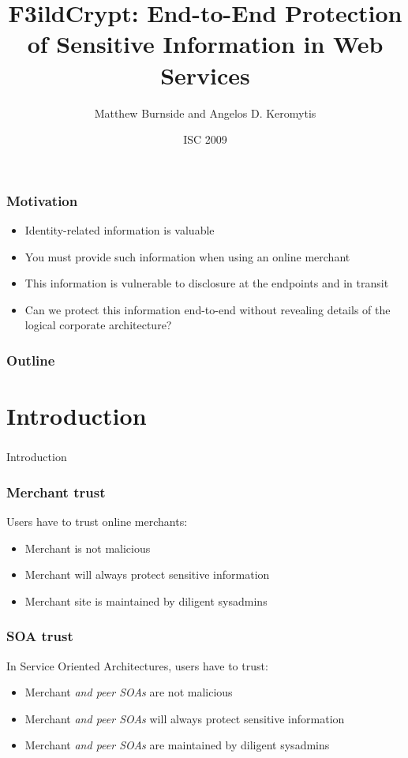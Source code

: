 \documentclass{beamer}
\title[F3ildCrypt]{F3ildCrypt: End-to-End Protection of Sensitive Information
in Web Services}
\author[Burnside, Keromytis]{Matthew Burnside and Angelos D. Keromytis}
\institute[Columbia University]{
Department of Computer Science\\
Columbia University\\
\texttt{\{mb, angelos\}@cs.columbia.edu}
}
\date{ISC 2009}
\begin{document}
\begin{frame}[plain]
    \titlepage
\end{frame}

\begin{frame}
\frametitle{Motivation}
\begin{itemize}
\item Identity-related information is valuable
\item You must provide such information when using an online merchant
\item This information is vulnerable to disclosure at the endpoints and in
transit 
\item Can we protect this information end-to-end without revealing details of
the logical corporate architecture?
\end{itemize}
\end{frame}

\begin{frame}
\frametitle{Outline}
\tableofcontents
\end{frame}

\section{Introduction}
\begin{frame}
\frametitle{}
\begin{center}
Introduction
\end{center}
\end{frame}

\begin{frame}
\frametitle{Merchant trust}
Users have to trust online merchants:
\smallskip
\begin{itemize}
\item Merchant is not malicious
\item Merchant will always protect sensitive information
\item Merchant site is maintained by diligent sysadmins
\end{itemize}
\end{frame}

\begin{frame}
\frametitle{SOA trust}
In Service Oriented Architectures, users have to trust:
\smallskip
\begin{itemize}
\item Merchant \emph{and peer SOAs} are not malicious
\item Merchant \emph{and peer SOAs} will always protect sensitive information
\item Merchant \emph{and peer SOAs} are maintained by diligent sysadmins
\end{itemize}
\end{frame}
\end{document}
